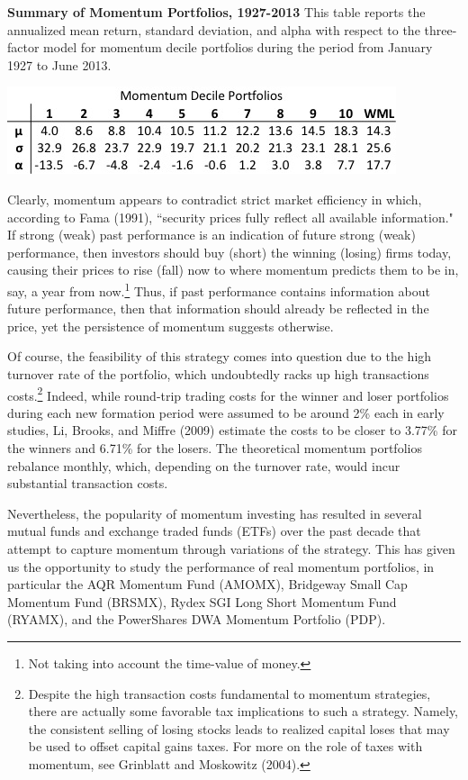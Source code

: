 \documentclass[12pt]{article}
\begin{document}
\begin{table}[h]
\centering
\caption{\textbf{Summary of Momentum Portfolios, 1927-2013} {\footnotesize This table reports the annualized mean return, standard deviation, and alpha with respect to the three-factor model for momentum decile portfolios during the period from January 1927 to June 2013. }}
\includegraphics[scale=0.6]{Deciles.jpg}
\end{table}

Clearly, momentum appears to contradict strict market efficiency in which, according to Fama (1991), ``security prices fully reflect all available information." If strong (weak) past performance is an indication of future strong (weak) performance, then investors should buy (short) the winning (losing) firms today, causing their prices to rise (fall) now to where momentum predicts them to be in, say, a year from now.\footnote{Not taking into account the time-value of money.} Thus, if past performance contains information about future performance, then that information should already be reflected in the price, yet the persistence of momentum suggests otherwise.

Of course, the feasibility of this strategy comes into question due to the high turnover rate of the portfolio, which undoubtedly racks up high transactions costs.\footnote{Despite the high transaction costs fundamental to momentum strategies, there are actually some favorable tax implications to such a strategy. Namely, the consistent selling of losing stocks leads to realized capital loses that may be used to offset capital gains taxes. For more on the role of taxes with momentum, see Grinblatt and Moskowitz (2004).} Indeed, while round-trip trading costs for the winner and loser portfolios during each new formation period were assumed to be around 2\% each in early studies, Li, Brooks, and Miffre (2009) estimate the costs to be closer to 3.77\% for the winners and 6.71\% for the losers. The theoretical momentum portfolios rebalance monthly, which, depending on the turnover rate, would incur substantial transaction costs. 

Nevertheless, the popularity of momentum investing has resulted in several mutual funds and exchange traded funds (ETFs) over the past decade that attempt to capture momentum through variations of the strategy. This has given us the opportunity to study the performance of real momentum portfolios, in particular the AQR Momentum Fund (AMOMX), Bridgeway Small Cap Momentum Fund (BRSMX), Rydex SGI Long Short Momentum Fund (RYAMX), and the PowerShares DWA Momentum Portfolio (PDP).
\end{document}

